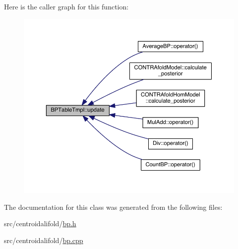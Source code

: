 Here is the caller graph for this function\+:
\nopagebreak
\begin{figure}[H]
\begin{center}
\leavevmode
\includegraphics[width=350pt]{class_b_p_table_tmpl_a124e591ae0fcc59fa50aafd2ec2fbb9a_icgraph}
\end{center}
\end{figure}




The documentation for this class was generated from the following files\+:\begin{DoxyCompactItemize}
\item 
src/centroidalifold/\hyperlink{bp_8h}{bp.\+h}\item 
src/centroidalifold/\hyperlink{bp_8cpp}{bp.\+cpp}\end{DoxyCompactItemize}
